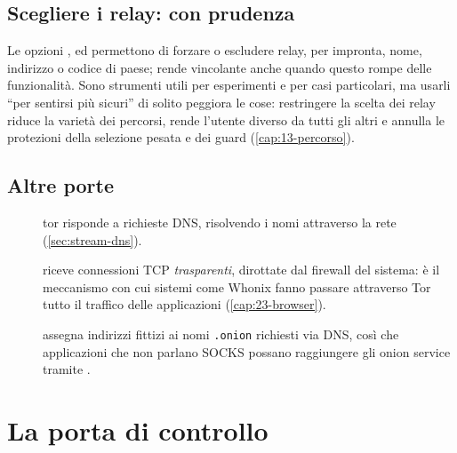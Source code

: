 \subsection{Scegliere i relay: con prudenza}

Le opzioni ,  ed  permettono di forzare o escludere relay, per impronta, nome, indirizzo o codice di paese;  rende vincolante  anche quando questo rompe delle funzionalità. Sono strumenti utili per esperimenti e per casi particolari, ma usarli \enquote{per sentirsi più sicuri} di solito peggiora le cose: restringere la scelta dei relay riduce la varietà dei percorsi, rende l'utente diverso da tutti gli altri e annulla le protezioni della selezione pesata e dei guard (\cref{cap:13-percorso}).

\subsection{Altre porte}

\begin{description}
  \item[] tor risponde a richieste DNS, risolvendo i nomi attraverso la rete (\cref{sec:stream-dns}).
  \item[] riceve connessioni TCP \emph{trasparenti}, dirottate dal firewall del sistema: è il meccanismo con cui sistemi come Whonix fanno passare attraverso Tor tutto il traffico delle applicazioni (\cref{cap:23-browser}).
  \item[] assegna indirizzi fittizi ai nomi \texttt{.onion} richiesti via DNS, così che applicazioni che non parlano SOCKS possano raggiungere gli onion service tramite .
\end{description}

\section{La porta di controllo}\label{sec:torrc-controllo}

